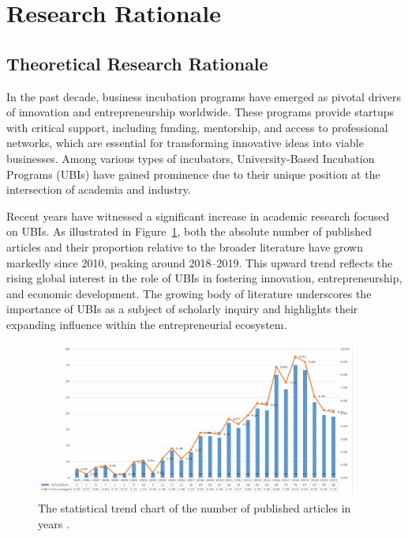 \documentclass[../Main.tex]{subfiles}
\begin{document}
	\section{Research Rationale}
	\label{section:1.1_Research_rationale}
	
	\subsection{Theoretical Research Rationale}
	\label{subsection:1.1.1_Theoretical_research_rationale}
	In the past decade, business incubation programs have emerged as pivotal drivers of innovation and entrepreneurship worldwide. These programs provide startups with critical support, including funding, mentorship, and access to professional networks, which are essential for transforming innovative ideas into viable businesses. Among various types of incubators, University-Based Incubation Programs (UBIs) have gained prominence due to their unique position at the intersection of academia and industry.

	Recent years have witnessed a significant increase in academic research focused on UBIs. As illustrated in Figure~\ref{fig:ubi_publications_trend}, both the absolute number of published articles and their proportion relative to the broader literature have grown markedly since 2010, peaking around 2018–2019. This upward trend reflects the rising global interest in the role of UBIs in fostering innovation, entrepreneurship, and economic development. The growing body of literature underscores the importance of UBIs as a subject of scholarly inquiry and highlights their expanding influence within the entrepreneurial ecosystem.

	\begin{figure}[h]
		\centering
		\includegraphics[width=0.95\textwidth]{./Figure/published_artticle_per_year.png}
		\caption{The statistical trend chart of the number of published articles in years \cite{Ding2024ResearchSH}.}
		\label{fig:ubi_publications_trend}
	\end{figure}
\end{document}
